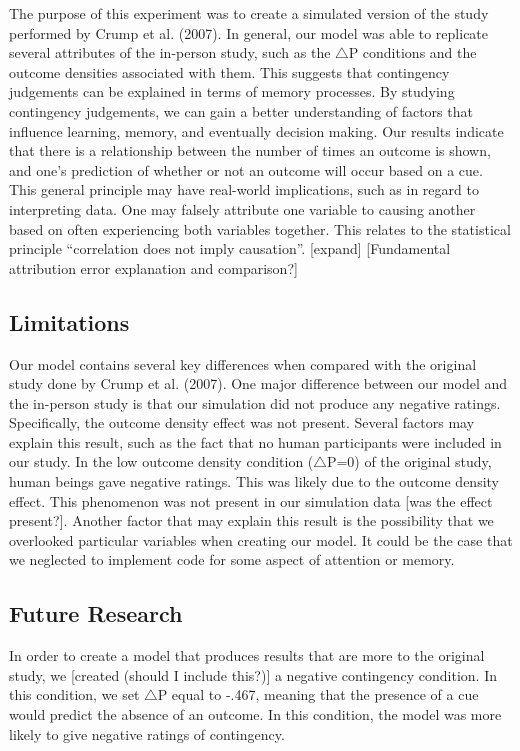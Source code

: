 \documentclass[
  english,
  man,floatsintext]{apa6}
\begin{document}
The purpose of this experiment was to create a simulated version of the study performed by Crump et al. (2007). In general, our model was able to replicate several attributes of the in-person study, such as the \(\triangle\)P conditions and the outcome densities associated with them. This suggests that contingency judgements can be explained in terms of memory processes.
By studying contingency judgements, we can gain a better understanding of factors that influence learning, memory, and eventually decision making. Our results indicate that there is a relationship between the number of times an outcome is shown, and one's prediction of whether or not an outcome will occur based on a cue. This general principle may have real-world implications, such as in regard to interpreting data. One may falsely attribute one variable to causing another based on often experiencing both variables together. This relates to the statistical principle \enquote{correlation does not imply causation}. {[}expand{]}
{[}Fundamental attribution error explanation and comparison?{]}

\hypertarget{limitations}{%
\subsection{Limitations}\label{limitations}}

Our model contains several key differences when compared with the original study done by Crump et al. (2007). One major difference between our model and the in-person study is that our simulation did not produce any negative ratings. Specifically, the outcome density effect was not present. Several factors may explain this result, such as the fact that no human participants were included in our study. In the low outcome density condition (\(\triangle\)P=0) of the original study, human beings gave negative ratings. This was likely due to the outcome density effect. This phenomenon was not present in our simulation data {[}was the effect present?{]}. Another factor that may explain this result is the possibility that we overlooked particular variables when creating our model. It could be the case that we neglected to implement code for some aspect of attention or memory.

\hypertarget{future-research}{%
\subsection{Future Research}\label{future-research}}

In order to create a model that produces results that are more to the original study, we {[}created (should I include this?){]} a negative contingency condition. In this condition, we set \(\triangle\)P equal to -.467, meaning that the presence of a cue would predict the absence of an outcome. In this condition, the model was more likely to give negative ratings of contingency.
\end{document}
